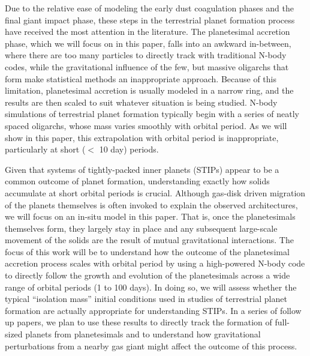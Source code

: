 \documentclass[twocolumn]{aastex63}
\begin{document}
Due to the relative ease of modeling the early dust coagulation phases
and the final giant impact phase, these steps in the terrestrial
planet formation process have received the most attention in the
literature. The planetesimal accretion phase, which we will focus on
in this paper, falls into an awkward in-between, where there are too
many particles to directly track with traditional N-body codes, while
the gravitational influence of the few, but massive oligarchs that
form make statistical methods an inappropriate approach. Because of
this limitation, planetesimal accretion is usually modeled in a narrow
ring, and the results are then scaled to suit whatever situation is being studied. N-body simulations of terrestrial planet formation typically begin with a series of neatly spaced oligarchs, whose mass varies smoothly with orbital period. As we will show in this paper, this extrapolation with orbital period is inappropriate, particularly at short ($<$ 10 day) periods.

Given that systems of tightly-packed inner planets (STIPs) appear to
be a common outcome of planet formation, understanding exactly how
solids accumulate at short orbital periods is crucial. Although
gas-disk driven migration of the planets themselves is often invoked
to explain the observed architectures, we will focus on an in-situ
model in this paper. That is, once the planetesimals themselves form,
they largely stay in place and any subsequent large-scale movement of
the solids are the result of mutual gravitational interactions. The
focus of this work will be to understand how the outcome of the
planetesimal accretion process scales with orbital period by using a
high-powered N-body code to directly follow the growth and evolution
of the planetesimals across a wide range of orbital periods (1 to 100
days). In doing so, we will assess whether the typical ``isolation
mass'' initial conditions used in studies of terrestrial planet formation are actually appropriate for understanding STIPs. In a series of follow up papers, we plan to use these results to directly track the formation of full-sized planets from planetesimals and to understand how gravitational perturbations from a nearby gas giant might affect the outcome of this process.
\end{document}
